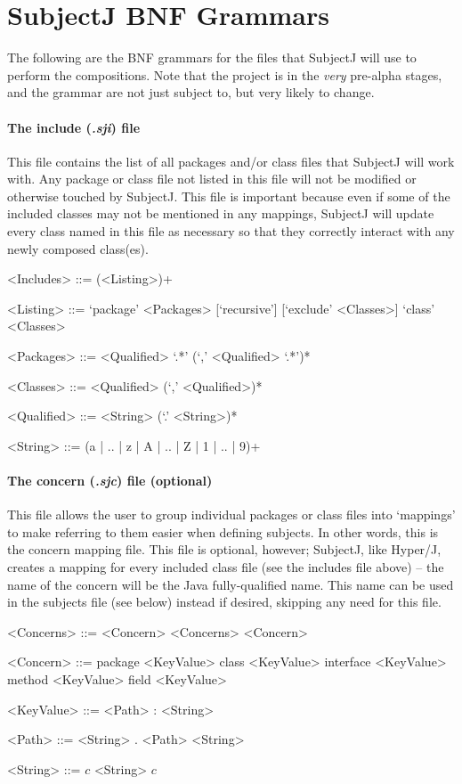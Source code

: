 \documentclass[11pt,letterpaper]{article}
\begin{document}
    \section*{SubjectJ BNF Grammars}
    The following are the BNF grammars for the files that SubjectJ will use to perform the compositions. Note that the project is in the \emph{very} pre-alpha stages, and the grammar are not just subject to, but very likely to change.
    \paragraph{The include (\emph{.sji}) file}
    This file contains the list of all packages and/or class files that SubjectJ will work with. Any package or class file not listed in this file will not be modified or otherwise touched by SubjectJ. This file is important because even if some of the included classes may not be mentioned in any mappings, SubjectJ will update every class named in this file as necessary so that they correctly interact with any newly composed class(es).
    \begin{grammar}
        <Includes> ::= (<Listing>)+

        <Listing> ::= `package' <Packages> [`recursive'] [`exclude' <Classes>]
        \alt `class' <Classes>

        <Packages> ::= <Qualified> `.*' (`,' <Qualified> `.*')*

        <Classes> ::= <Qualified> (`,' <Qualified>)*

        <Qualified> ::= <String> (`.' <String>)*

        <String> ::= (a | .. | z | A | .. | Z | 1 | .. | 9)+
    \end{grammar}

    \paragraph{The concern (\emph{.sjc}) file (optional)}
    This file allows the user to group individual packages or class files into `mappings' to make referring to them easier when defining subjects. In other words, this is the concern mapping file. This file is optional, however; SubjectJ, like Hyper/J, creates a mapping for every included class file (see the includes file above) -- the name of the concern will be the Java fully-qualified name. This name can be used in the subjects file (see below) instead if desired, skipping any need for this file.
    \begin{grammar}
        <Concerns> ::= <Concern> <Concerns>
        \alt <Concern>

        <Concern> ::= package <KeyValue>
        \alt class <KeyValue>
        \alt interface <KeyValue>
        \alt method <KeyValue>
        \alt field <KeyValue>

        <KeyValue> ::= <Path> : <String>

        <Path> ::= <String> . <Path>
        \alt <String>

        <String> ::= $c$ <String>
        \alt $c$
    \end{grammar}
\end{document}
